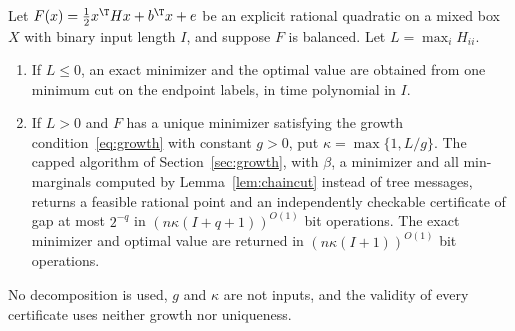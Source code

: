 \begin{theorem}\label{thm:balanced}
Let $F(x)=\tfrac12x^{\T}Hx+b^{\T}x+e$ be an explicit rational quadratic on a
mixed box $X$ with binary input length $I$, and suppose $F$ is balanced. Let
$L=\max_iH_{ii}$.
\begin{enumerate}
\item If $L\le0$, an exact minimizer and the optimal value are obtained from one minimum cut on
the endpoint labels, in time polynomial in $I$.
\item If $L>0$ and $F$ has a unique minimizer satisfying the growth condition~\eqref{eq:growth}
with constant $g>0$, put $\kappa=\max\{1,L/g\}$. The capped algorithm of
Section~\ref{sec:growth}, with $\beta$, a minimizer and all min-marginals computed by
Lemma~\ref{lem:chaincut} instead of tree messages, returns a feasible rational point and an
independently checkable certificate of gap at most $2^{-q}$ in
$(n\kappa(I+q+1))^{O(1)}$ bit operations. The exact minimizer and optimal value are returned in
$(n\kappa(I+1))^{O(1)}$ bit operations.
\end{enumerate}
No decomposition is used, $g$ and $\kappa$ are not inputs, and the validity of every certificate
uses neither growth nor uniqueness.
\end{theorem}

